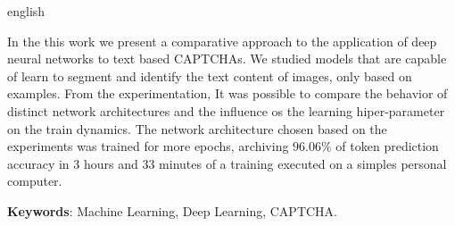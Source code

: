 \begin{resumo}[Abstract]
 \begin{otherlanguage*}{english}
  
  In the this work we present a comparative approach to the application of deep neural networks to text based CAPTCHAs. We studied models that are capable of learn to segment and identify the text content of images, only based on examples. From the experimentation, It was possible to compare the behavior of distinct network architectures and the influence os the learning hiper-parameter on the train dynamics. The network architecture chosen based on the experiments was trained for more epochs, archiving $96.06\%$ of token prediction accuracy in 3 hours and 33 minutes of a training executed on a simples personal computer.
  
 
   \vspace{\onelineskip}
 
   \noindent
   \textbf{Keywords}: Machine Learning, Deep Learning, CAPTCHA.
 \end{otherlanguage*}
\end{resumo}